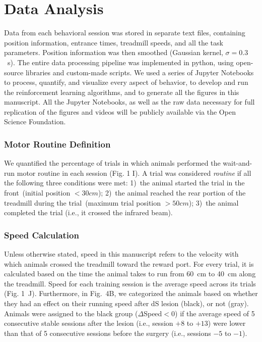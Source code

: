 \section{Data Analysis} 
\label{ch:methods:dataAnalysis}

Data from each behavioral session was stored in separate text files, containing position information, entrance times, treadmill speeds, and all the task parameters.
Position information was then smoothed (Gaussian kernel, $\sigma = 0.3$~s).
The entire data processing pipeline was implemented in python, using open-source libraries and custom-made scripts.
We used a series of Jupyter Notebooks to process, quantify, and visualize every aspect of behavior, to develop and run the reinforcement learning algorithms, and to generate all the figures in this manuscript.
All the Jupyter Notebooks, as well as the raw data necessary for full replication of the figures and videos will be publicly available via the Open Science Foundation.

\subsubsection*{Motor Routine Definition}
We quantified the percentage of trials in which animals performed the wait-and-run motor routine in each session (Fig. 1 I).
A trial was considered \textit{routine} if all the following three conditions were met:
1)~the animal started the trial in the front~(initial position $< 30 cm$);
2)~the animal reached the rear portion of the treadmill during the trial~(maximum trial position $>50 cm$);
3)~the animal completed the trial (i.e., it crossed the infrared beam).

\subsubsection*{Speed Calculation}
Unless otherwise stated, speed in this manuscript refers to the velocity with which animals crossed the treadmill toward the reward port.
For every trial, it is calculated based on the time the animal takes to run from 60~cm to 40~cm along the treadmill.
Speed for each training session is the average speed across its trials (Fig. 1~J).
Furthermore, in Fig.~4B, we categorized the animals based on whether they had an effect on their running speed after dS lesion (black), or not (gray).
Animals were assigned to the black group ($\Delta$Speed$<0$) if the average speed of 5 consecutive stable sessions after the lesion (i.e., session $+8$ to $+13$) were lower than that of 5 consecutive sessions before the surgery (i.e., sessions $-5$ to $-1$).



